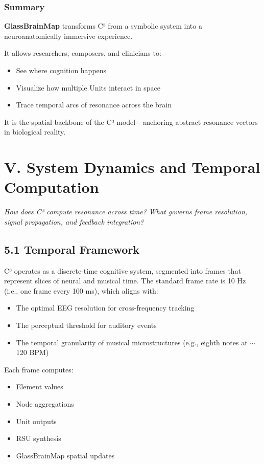 \subsubsection*{Summary}

\textbf{GlassBrainMap} transforms C³ from a symbolic system into a neuroanatomically immersive experience.

It allows researchers, composers, and clinicians to:

\begin{itemize}
    \item See where cognition happens
    \item Visualize how multiple Units interact in space
    \item Trace temporal arcs of resonance across the brain
\end{itemize}

It is the spatial backbone of the C³ model—anchoring abstract resonance vectors in biological reality.

\section*{V. System Dynamics and Temporal Computation}

\textit{How does C³ compute resonance across time? What governs frame resolution, signal propagation, and feedback integration?}

\subsection*{5.1 Temporal Framework}

C³ operates as a discrete-time cognitive system, segmented into frames that represent slices of neural and musical time. The standard frame rate is 10 Hz (i.e., one frame every 100 ms), which aligns with:

\begin{itemize}
    \item The optimal EEG resolution for cross-frequency tracking
    \item The perceptual threshold for auditory events
    \item The temporal granularity of musical microstructures (e.g., eighth notes at $\sim$120 BPM)
\end{itemize}

Each frame computes:

\begin{itemize}
    \item Element values
    \item Node aggregations
    \item Unit outputs
    \item RSU synthesis
    \item GlassBrainMap spatial updates
\end{itemize}

